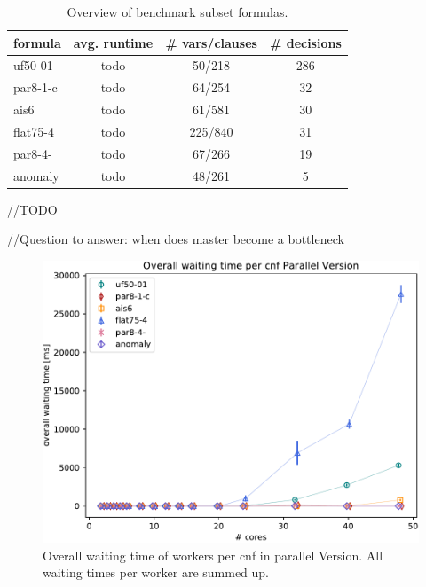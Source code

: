 \documentclass[letterpaper]{article}
\begin{document}
\begin{table}
    \centering
    \begin{tabular}{|l|c|c|c|}
        \hline
        formula & avg. runtime & \# vars/clauses & \# decisions \\
        \hline
        \hline
        uf50-01 & todo & 50/218 & 286\\
        \hline
        par8-1-c & todo & 64/254 & 32 \\
        \hline
        ais6 & todo & 61/581 & 30 \\
        \hline
        flat75-4 & todo & 225/840 & 31\\
        \hline
        par8-4- & todo & 67/266 & 19 \\
        \hline
        anomaly & todo & 48/261 & 5 \\
        \hline
    \end{tabular}
    \caption{Overview of benchmark subset formulas.}
    \label{tab:cnfs_parallel}
\end{table}

//TODO

//Question to answer: when does master become a bottleneck
\begin{figure}
    \centering
    \includegraphics[width=\columnwidth]{figures/dpll_waiting_parallel}
    \caption{Overall waiting time of workers per cnf in parallel Version.
    All waiting times per worker are summed up.
    \label{fig:dpll_parallel_waiting}}
\end{figure}
\end{document}
